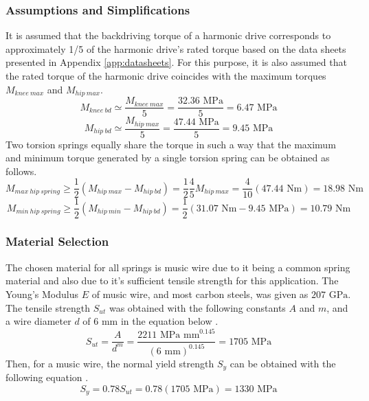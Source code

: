 \subsubsection{Assumptions and Simplifications}
It is assumed that the backdriving torque of a harmonic drive corresponds to approximately 1/5 of the harmonic drive's rated torque based on the data sheets presented in Appendix \ref{app:datasheets}. For this purpose, it is also assumed that the rated torque of the harmonic drive coincides with the maximum torques $M_{knee\ max}$ and $M_{hip\ max}$. 
\begin{equation}
    M_{knee\ bd} \simeq \frac{M_{knee\ max}}{5} = \frac{32.36\text{ MPa}}{5}= 6.47\text{ MPa}
\end{equation}
\begin{equation}
    M_{hip\ bd} \simeq \frac{M_{hip\ max}}{5} = \frac{47.44\text{ MPa}}{5} = 9.45\text{ MPa}
\end{equation}
Two torsion springs equally share the torque in such a way that the maximum and minimum torque generated by a single torsion spring can be obtained as follows.
\begin{equation}
    M_{max\ hip\ spring} \geq \frac{1}{2}(M_{hip\ max} - M_{hip\ bd}) = \frac{1}{2} \frac{4}{5}M_{hip\ max} = \frac{4}{10}(47.44\text{ Nm}) = 18.98\text{ Nm}
\end{equation}
\begin{equation}
    M_{min\ hip\ spring} \geq \frac{1}{2}(M_{hip\ min} - M_{hip\ bd}) = \frac{1}{2} (31.07\text{ Nm} - 9.45\text{ MPa}) = 10.79\text{ Nm}
\end{equation}
\subsubsection{Material Selection}
The chosen material for all springs is music wire due to it being a common spring material and also due to it's sufficient tensile strength for this application. The Young's Modulus $E$ of music wire, and most carbon steels, was given as $207\text{ GPa}$. The tensile strength $S_{ut}$ was obtained with the following constants $A$ and $m$, and a wire diameter $d$ of 6 mm in the equation below \cite{budynas_shigleys_2015}.
\begin{equation}
    S_{ut} = \frac{A}{d^m} = \frac{2211\text{ MPa\ mm}^{0.145}}{(6\text{ mm})^{0.145}} = 1705\text{ MPa}
\end{equation}
Then, for a music wire, the normal yield strength $S_y$ can be obtained with the following equation \cite{budynas_shigleys_2015}.
\begin{equation}
    S_y = 0.78S_{ut} = 0.78(1705\text{ MPa}) = 1330\text{ MPa}
\end{equation}
